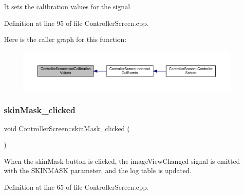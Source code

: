It sets the calibration values for the signal 

Definition at line 95 of file Controller\+Screen.\+cpp.

Here is the caller graph for this function\+:
\nopagebreak
\begin{figure}[H]
\begin{center}
\leavevmode
\includegraphics[width=350pt]{class_controller_screen_ae4d6a51231fb1f6f8809ce3d036592bd_icgraph}
\end{center}
\end{figure}
\mbox{\label{class_controller_screen_a4d9db4a832f667aacb7d7532f752fd1b}} 
\subsubsection{\texorpdfstring{skin\+Mask\+\_\+clicked}{skinMask\_clicked}}
{\footnotesize\ttfamily void Controller\+Screen\+::skin\+Mask\+\_\+clicked (\begin{DoxyParamCaption}{ }\end{DoxyParamCaption})\hspace{0.3cm}{\ttfamily [slot]}}

When the skin\+Mask button is clicked, the image\+View\+Changed signal is emitted with the S\+K\+I\+N\+M\+A\+SK parameter, and the log table is updated. 

Definition at line 65 of file Controller\+Screen.\+cpp.

